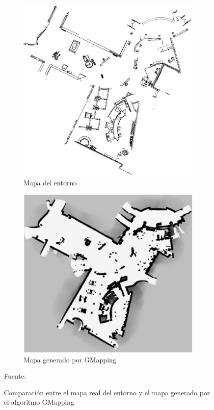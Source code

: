 \begin{figure}[H]
    \centering
    \begin{subfigure}[b]{0.40\textwidth}
    \includegraphics[width=\textwidth, height=\textwidth]{figures/02marco_conceptual/Mapa.PNG}
    \caption{Mapa del entorno}
    \label{fig:gmapping_sim}
    \end{subfigure}
    \begin{subfigure}[b]{0.40\textwidth}
    \includegraphics[width=\textwidth, height=\textwidth]{figures/02marco_conceptual/Mapa_generado.PNG}
    \caption{Mapa generado por GMapping}
    \label{fig:gmapping_map}
    \end{subfigure}
    \caption{Comparación entre el mapa real del entorno y el mapa generado por el algoritmo GMapping}
    Fuente: \cite{thrun_probabilistic_2005}
    \label{fig:GMapping}
\end{figure}


